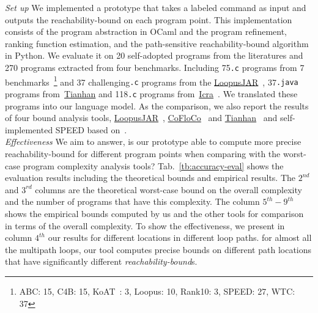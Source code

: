 \emph{Set up} We implemented a prototype {\THESYSTEM} that takes a labeled command as input 
and outputs the reachability-bound on each program point.
This implementation consists of the 
program abstraction in OCaml and the program refinement, ranking function estimation, and the path-sensitive reachability-bound algorithm in Python.
We evaluate it on 20 self-adopted programs from the literatures and 270 programs extracted from four benchmarks. 
Including 75{\tt .c} programs from 7 benchmarks~\cite{BenchmarkLoops}\footnote{ABC: 15, C4B: 15, KoAT~\cite{BrockschmidtEFFG14,FalkeKS12,FalkeKS11}: 3, Loopus: 10, Rank10: 3, SPEED: 27, WTC: 37} and 37 challenging{\tt .c} programs 
from the \hyperlink{https://forsyte.at/static/people/sinn/loopusJAR/index.html}{LoopusJAR}~\cite{BenchmarkLoops,SinnZV17},
37{\tt .java} programs from~\hyperlink{https://zenodo.org/record/5140586\#.Y5pBoC-B1QI}{Tianhan}\cite{BenchmarkTianhan,LuCT21}
and 118{\tt .c} programs from~\hyperlink{https://github.com/icra-team/icra}{Icra}~\cite{BenchmarkIcra,KincaidBCR19,CyphertBKR19}.
We translated these programs into our language model.
As the comparison, we also report the results of four bound analysis tools, 
\hyperlink{https://forsyte.at/software/loopus/}{LoopusJAR}~\cite{SinnZV17},
\hyperlink{https://github.com/aeflores/CoFloCo/tree/master/src}{CoFloCo}~\cite{ToolCofloco,Montoya17,Flores-Montoya16,Flores-MontoyaH14}
and \hyperlink{https://zenodo.org/record/5140586\#.Y5pBoC-B1QI}{Tianhan}~\cite{BenchmarkTianhan}
and self-implemented SPEED based on~\cite{GulwaniJK09}.
\\
\emph{Effectiveness} We aim to answer, is our prototype able to compute more precise reachability-bound for different program points when comparing with the worst-case program
complexity analysis tools?
Tab.~\ref{tb:accuracy-eval} shows the evaluation results including the theoretical bounds and empirical results.
The $2^{nd}$ and $3^{rd}$ columns are the theoretical worst-case bound on the overall complexity and the number of programs that have this complexity. The column $5^{th}-9^{th}$ shows the empirical bounds computed by us and the other tools for comparison in terms of the overall complexity.
To show the effectiveness, 
we present in column $4^{th}$ our results for different locations in different loop paths. for almost all the multipath loops, our tool computes precise bounds on different path locations that have significantly different \emph{reachability-bound}s.
